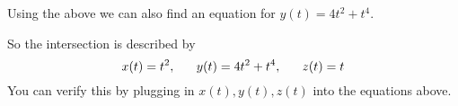 \documentclass[12pt]{exam}
\begin{document}
\begin{questions}
\begin{solution}
            Using the above we can also find an equation for \(y(t)=4t^2+t^4\).

            So the intersection is described by 
            \[
                x(t)=t^2,~~ \quad y(t)=4t^2+t^4,~~ \quad z(t)=t \hfill
            \]
            You can verify this by plugging in \(x(t),y(t),z(t)\) into the equations above.

            \end{solution}
        \else
            \vfill
        \fi
\end{questions}
\end{document}
